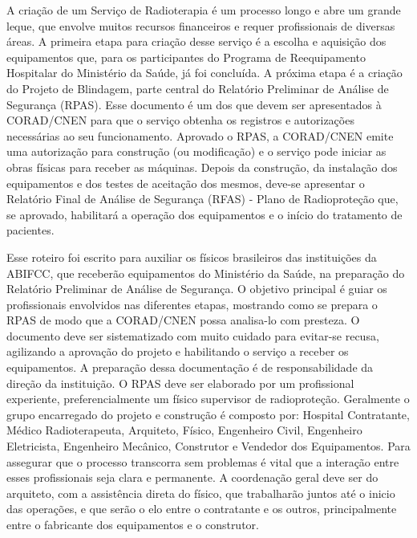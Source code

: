 \documentclass[
	12pt,				%
    oneside,			%
	a4paper,			%
	english,			%
	french,				%
	spanish,			%
	brazil,				%
	]{abntex2}
\begin{document}
A criação de um Serviço de Radioterapia é um processo longo e abre um grande leque, que envolve muitos recursos financeiros e requer profissionais de diversas áreas. A primeira etapa para criação desse serviço é a escolha e aquisição dos equipamentos que, para os participantes do Programa de Reequipamento Hospitalar do Ministério da Saúde, já foi concluída. A próxima etapa é a criação do Projeto de Blindagem, parte central do Relatório Preliminar de Análise de Segurança (RPAS). Esse documento é um dos que devem ser apresentados à CORAD/CNEN para que o serviço obtenha os registros e autorizações necessárias ao seu funcionamento. Aprovado o RPAS, a CORAD/CNEN emite uma autorização para construção (ou modificação) e o serviço pode iniciar as obras físicas para receber as máquinas. Depois da construção, da instalação dos equipamentos e dos testes de aceitação dos mesmos, deve-se apresentar o Relatório Final de Análise de Segurança (RFAS) - Plano de Radioproteção que, se aprovado, habilitará a operação dos equipamentos e o início do tratamento de pacientes. 

Esse roteiro foi escrito para auxiliar os físicos brasileiros das instituições da ABIFCC, que receberão equipamentos do Ministério da Saúde, na preparação do Relatório Preliminar de Análise de Segurança. O objetivo principal é guiar os profissionais envolvidos nas diferentes etapas, mostrando como se prepara o RPAS de modo que a CORAD/CNEN possa analisa-lo com presteza. O documento deve ser sistematizado com muito cuidado para evitar-se recusa, agilizando a aprovação do projeto e habilitando o serviço a receber os equipamentos. A preparação dessa documentação é de responsabilidade da direção da instituição. O RPAS deve ser elaborado por um profissional experiente, preferencialmente um físico supervisor de radioproteção. Geralmente o grupo encarregado do projeto e construção é composto por: Hospital Contratante, Médico Radioterapeuta, Arquiteto, Físico, Engenheiro Civil, Engenheiro Eletricista, Engenheiro Mecânico, Construtor e Vendedor dos Equipamentos. Para assegurar que o processo transcorra sem problemas é vital que a interação entre esses profissionais seja clara e permanente. A coordenação geral deve ser do arquiteto, com a assistência direta do físico, que trabalharão juntos até o inicio das operações, e que serão o elo entre o contratante e os outros, principalmente entre o fabricante dos equipamentos e o construtor. 
\end{document}

